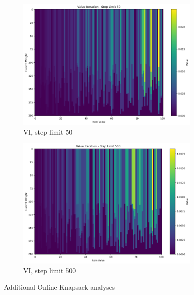 \documentclass[12pt]{article}
\begin{document}
\begin{figure}[H]
\vspace{0.5em}
\begin{subcaptiongroup}
\begin{subfigure}{0.48\textwidth}
\includegraphics[width=\linewidth]{../Q2/part1/value_iteration_-_step_limit_50.png}
\caption{VI, step limit 50}
\end{subfigure}\hfill
\begin{subfigure}{0.48\textwidth}
\includegraphics[width=\linewidth]{../Q2/part1/value_iteration_-_step_limit_500.png}
\caption{VI, step limit 500}
\end{subfigure}
\end{subcaptiongroup}
\caption{Additional Online Knapsack analyses}
\end{figure}
\end{document}
